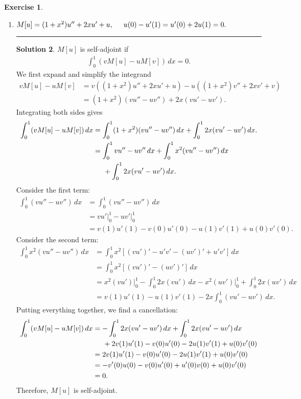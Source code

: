 \documentclass{article}
\theoremstyle{definition}
\newtheorem*{exer*}{Exercise}
\newtheorem*{sln*}{Solution}
\begin{document}
\begin{exer*}
\begin{enumerate}
\begin{sln*}
			
			
			
		\end{sln*}
		
		
		
		
		
		
		\newpage
		\item $M[u] = (1+x^2)u'' + 2xu' + u,\hspace{0.5cm} u(0) - u'(1) = u'(0) + 2u(1) = 0.$\\
		\noindent\rule{\textwidth}{0.5pt}
		\begin{sln*}
			$M[u]$ is self-adjoint if 
			\begin{align*}
			\int^1_0 (vM[u] - uM[v])\,dx = 0.
			\end{align*}
			We first expand and simplify the integrand
			\begin{align*}
			vM[u] - uM[v] &= v((1+x^2)u'' + 2xu' + u) - u((1+x^2)v'' + 2xv' + v)\\
			&= (1+x^2)(vu'' - uv'') + 2x(vu' - uv').
			\end{align*}
			Integrating both sides gives
			\begin{align*}
			\int^1_0 (vM[u] - uM[v])\,dx &= \int^1_0 (1+x^2)(vu'' - uv'')\,dx + \int^1_0 2x(vu' - uv')\,dx.\\
			&=\int^1_0 vu'' - uv''\,dx + \int^1_0 x^2(vu'' - uv'')\,dx\\
			&\hspace{0.5cm} + \int^1_0 2x(vu' - uv')\,dx.
			\end{align*}
			Consider the first term:
			\begin{align*}
			\int^1_0 (vu'' - uv'')\,dx &= \int^1_0 (vu'' - uv'')\,dx\\
			&= vu'\bigg\vert^1_0 - uv'\bigg\vert^1_0\\
			&= v(1)u'(1) - v(0)u'(0) - u(1)v'(1) + u(0)v'(0).
			\end{align*}
			Consider the second term:
			\begin{align*}
			\int^1_0 x^2(vu'' - uv'')\,dx &= \int^1_0 x^2 \left[ (vu')' - u'v' - (uv')' + u'v'  \right]\,dx\\
			&= \int^1_0 x^2\left[ (vu')' - (uv')' \right]\,dx\\
			&= x^2(vu')\bigg\vert^1_0 - \int^1_0 2x(vu')\,dx - x^2(uv')\bigg\vert^1_0 + \int^1_0 2x(uv')\,dx\\
			&= v(1)u'(1) - u(1)v'(1) - 2x\int^1_0 (vu' - uv')\,dx.
			\end{align*}
			Putting everything together, we find a cancellation:
			\begin{align*}
			\int^1_0 (vM[u] - uM[v])\,dx &= -\int^1_0 2x(vu' - uv')\,dx + \int^1_0 2x(vu' - uv')\,dx\\&\hspace{0.5cm} + 2v(1)u'(1) - v(0)u'(0) - 2u(1)v'(1) + u(0)v'(0)  \\
			&= 2v(1)u'(1) - v(0)u'(0) - 2u(1)v'(1) + u(0)v'(0)\\
			&= -v'(0)u(0) - v(0)u'(0) + u'(0)v(0) + u(0)v'(0)\\
			&= 0.
			\end{align*} 
			Therefore, $M[u]$ is self-adjoint. 
			

\end{sln*}
\end{enumerate}
\end{exer*}
\end{document}
